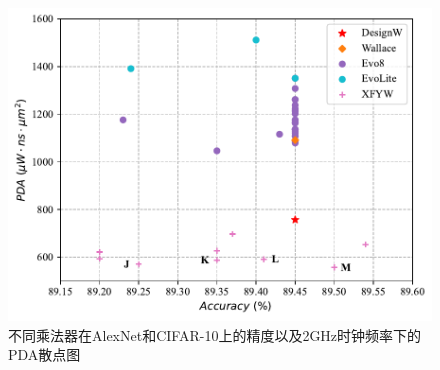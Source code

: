 \begin{figure}[!htb]
    \centering
    \includegraphics[width=0.9\linewidth]{figs/AC-AM-Adapt-VGG16_CIFAR-10_PDA_accuracy.pdf}
    \caption{不同乘法器在AlexNet和CIFAR-10上的精度以及2GHz时钟频率下的PDA散点图}
    \label{AC:AM:Adapt:Fig:VGG16_CIFAR-10_PDA_accuracy}
\end{figure}

